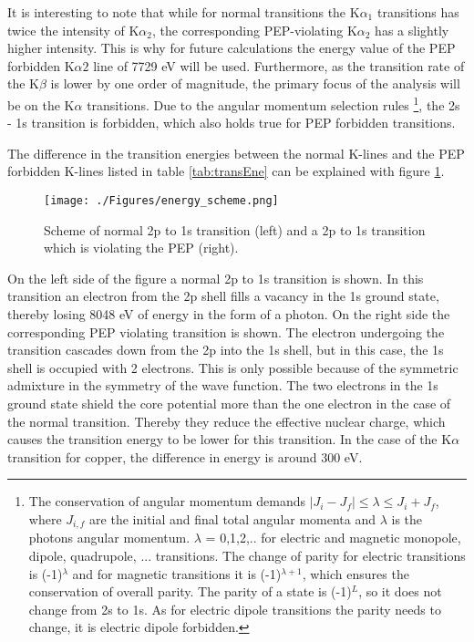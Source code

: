 It is interesting to note that while for normal transitions the K${\alpha _{1}}$ transitions has twice the intensity of K${\alpha_{2}}$, the corresponding PEP-violating K${\alpha_{2}}$ has a slightly higher intensity. This is why for future calculations the energy value of the PEP forbidden K${\alpha{2}}$ line of 7729 eV will be used. Furthermore, as the transition rate of the K${\beta}$ is lower by one order of magnitude, the primary focus of the analysis will be on the K${\alpha}$ transitions. Due to the angular momentum selection rules \footnote{The conservation of angular momentum demands $|J_{i}-J_{f}| \leq \lambda \leq J_{i}+J_{f}$, where $J_{i,f}$ are the initial and final total angular momenta and $\lambda$ is the photons angular momentum. $\lambda$ = 0,1,2,.. for electric and magnetic monopole, dipole, quadrupole, ... transitions. The change of parity for electric transitions is (-1)$^{\lambda}$ and for magnetic transitions it is (-1)$^{\lambda+1}$, which ensures the conservation of overall parity. The parity of a state is (-1)$^{L}$, so it does not change from 2s to 1s. As for electric dipole transitions the parity needs to change, it is electric dipole forbidden.}, the 2s - 1s transition is forbidden, which also holds true for PEP forbidden transitions.

The difference in the transition energies between the normal K-lines and the PEP forbidden K-lines listed in table \ref{tab:transEne} can be explained with figure \ref{fig:forbTrans}.
\begin{figure}[h]
 \centering
 \texttt{[image: ./Figures/energy\_scheme.png]}
 \caption{Scheme of normal 2p to 1s transition (left) and a 2p to 1s transition which is violating the PEP (right).}
 \label{fig:forbTrans}
\end{figure}
On the left side of the figure a normal 2p to 1s transition is shown. In this transition an electron from the 2p shell fills a vacancy in the 1s ground state, thereby losing 8048 eV of energy in the form of a photon. On the right side the corresponding PEP violating transition is shown. The electron undergoing the transition cascades down from the 2p into the 1s shell, but in this case, the 1s shell is occupied with 2 electrons. This is only possible because of the symmetric admixture in the symmetry of the wave function. The two electrons in the 1s ground state shield the core potential more than the one electron in the case of the normal transition. Thereby they reduce the effective nuclear charge, which causes the transition energy to be lower for this transition. In the case of the K${\alpha}$ transition for copper, the difference in energy is around 300 eV.
